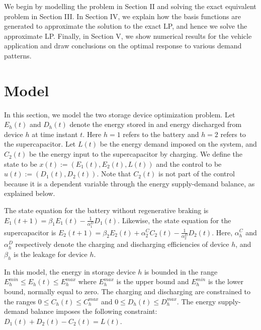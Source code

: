\documentclass[conference]{IEEEtran}
\begin{document}
We begin by modelling the problem in Section II and solving the exact equivalent problem in Section III. In Section IV, we explain how the basis functions are generated to approximate the solution to the exact LP, and hence we solve the approximate LP. Finally, in Section V, we show numerical results for the vehicle application and draw conclusions on the optimal response to various demand patterns. 

\section{Model}
In this section, we model the two storage device optimization problem. Let $E_{h}(t)$ and $D_{h}(t)$ denote the energy stored in and energy discharged from device $h$ at time instant $t$. Here $h=1$ refers to the battery and $h=2$ refers to the supercapacitor. Let $L(t)$ be the energy demand imposed on the system, and $C_{2}(t)$ be the energy input to the supercapacitor by charging. We define the state to be $x(t):=(E_{1}(t),E_{2}(t),L(t))$ and the control to be $u(t):=(D_{1}(t),D_{2}(t))$. Note that $C_{2}(t)$ is not part of the control because it is a dependent variable through the energy supply-demand balance, as explained below.

The state equation for the battery without regenerative braking is \begin{math}E_{1}(t+1)=\beta_{1}E_{1}(t)-\frac{1}{\alpha_{1}^{D}}D_{1}(t)\end{math}. Likewise, the state equation for the supercapacitor is \begin{math}E_{2}(t+1)=\beta_{2}E_{2}(t)+\alpha_{2}^{C}C_{2}(t)-\frac{1}{\alpha_{2}^{D}}D_{2}(t)\end{math}. Here, $\alpha^{C}_{h}$ and $\alpha^{D}_{h}$ respectively denote the charging and discharging efficiencies of device $h$, and $\beta_{h}$ is the leakage for device $h$.%

In this model, the energy in storage device $h$ is bounded in the range $E_{h}^{min}\leq E_{h}(t)\leq E_{h}^{max}$ where $E_{h}^{max}$ is the upper bound and $E_{h}^{min}$ is the lower bound, normally equal to zero. The charging and discharging are constrained to the ranges $0\leq C_{h}(t)\leq C_{h}^{max}$ and $0\leq D_{h}(t)\leq D_{h}^{max}$. The energy supply-demand balance imposes the following constraint: $D_{1}(t) + D_{2}(t) - C_{2}(t) = L(t)$.
\end{document}

